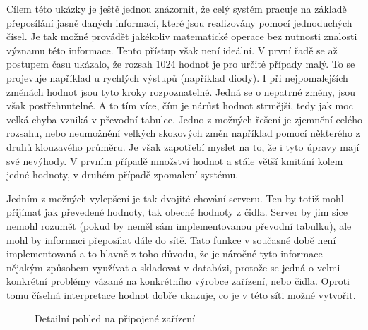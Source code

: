Cílem této ukázky je ještě jednou znázornit, že celý systém pracuje na základě přeposílání jasně daných informací, které jsou realizovány pomocí jednoduchých čísel. Je tak možné provádět jakékoliv matematické operace bez nutnosti znalosti významu této informace. Tento přístup však není i\-de\-ál\-ní. V první řadě se až postupem času ukázalo, že rozsah 1024 hodnot je pro určité případy malý. To se projevuje například u rychlých výstupů (například diody). I při nejpomalejších změnách hodnot jsou tyto kroky rozpoznatelné. Jedná se o nepatrné změny, jsou však postřehnutelné. A to tím více, čím je nárůst hodnot strmější, tedy jak moc velká chyba vzniká v převodní tabulce. Jedno z možných řešení je zjemnění celého rozsahu, nebo neumožnění velkých skokových změn například pomocí některého z druhů klouzavého průměru. Je však zapotřebí myslet na to, že i tyto úpravy mají své nevýhody. V prvním případě množství hodnot a stále větší kmitání kolem jedné hodnoty, v druhém případě zpomalení systému.

Jedním z možných vylepšení je tak dvojité chování serveru. Ten by totiž mohl přijímat jak převedené hodnoty, tak obecné hodnoty z čidla. Server by jim sice nemohl rozumět (pokud by neměl sám implementovanou převodní tabulku), ale mohl by informaci přeposílat dále do sítě. Tato funkce v současné době není implementovaná a to hlavně z toho důvodu, že je náročné tyto informace nějakým způsobem využívat a skladovat v databázi, protože se jedná o velmi konkrétní problémy vázané na konkrétního výrobce zařízení, nebo čidla. Oproti tomu číselná interpretace hodnot dobře ukazuje, co je v této síti možné vytvořit.

\begin{figure}[h]
    \centering
	\caption{Detailní pohled na připojené zařízení}
	\label{fig:speedy2}
\end{figure}

